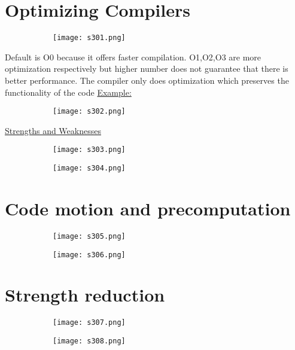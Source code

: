 \documentclass[8pt]{extreport}
\begin{document}
\section{Optimizing Compilers}
\begin{figure}[H]
\centering
\begin{subfigure}[b]{0.4\linewidth}
\texttt{[image: s301.png]}
\end{subfigure}
\end{figure}
Default is O0 because it offers faster compilation. O1,O2,O3 are more optimization respectively but higher number does not guarantee that there is better performance. The compiler only does optimization which preserves the functionality of the code
\underline{Example:}
\begin{figure}[H]
\centering
\begin{subfigure}[b]{0.4\linewidth}
\texttt{[image: s302.png]}
\end{subfigure}
\end{figure}
\underline{Strengths and Weaknesses}
\begin{figure}[H]
\centering
\begin{subfigure}[b]{0.4\linewidth}
\texttt{[image: s303.png]}
\end{subfigure}
\begin{subfigure}[b]{0.4\linewidth}
\texttt{[image: s304.png]}
\end{subfigure}
\end{figure}

\section{Code motion and precomputation}
\begin{figure}[H]
\centering
\begin{subfigure}[b]{0.4\linewidth}
\texttt{[image: s305.png]}
\end{subfigure}
\begin{subfigure}[b]{0.4\linewidth}
\texttt{[image: s306.png]}
\end{subfigure}
\end{figure}

\section{Strength reduction}
\begin{figure}[H]
\centering
\begin{subfigure}[b]{0.4\linewidth}
\texttt{[image: s307.png]}
\end{subfigure}
\begin{subfigure}[b]{0.4\linewidth}
\texttt{[image: s308.png]}
\end{subfigure}
\end{figure}
\end{document}
